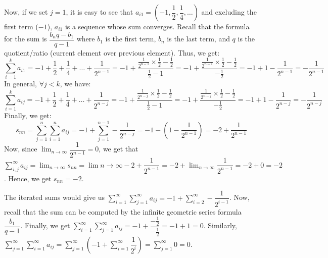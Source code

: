 \documentclass[11pt]{article}
\begin{document}
\begin{itemize}
        Now, if we set $j = 1$, it is easy to see that $a_{i1} = (-1,
        \dfrac{1}{2}, \dfrac{1}{4}, \dots)$ and excluding the first term
        ($-1$), $a_{i1}$ is a sequence whose sum converges. Recall that
        the formula for the sum is $\dfrac{b_nq - b_1}{q - 1}$ where $b_1$ is
        the first term, $b_n$ is the last term, and $q$ is the
        quotient/ratio (current element over previous element). Thus, we get:
        $$\sum_{i = 1}^k a_{i1} =  -1 + \dfrac{1}{2} + \dfrac{1}{4} + \dots +
        \dfrac{1}{2^{n - 1}} = -1 + \dfrac{\frac{1}{2^{n - 1}} \times
        \frac{1}{2} - \frac{1}{2}}{\frac{1}{2} - 1} = -1 + \dfrac{\frac{1}{2^{n
        - 1}} \times \frac{1}{2} - \frac{1}{2}}{-\frac{1}{2}} = -1 + 1 -
        \dfrac{1}{2^{n - 1}} = -\dfrac{1}{2^{n - 1}}$$
        In general, $\forall j < k$, we have:
        $$\sum_{i = 1}^k a_{ij} =  -1 + \dfrac{1}{2} + \dfrac{1}{4} + \dots +
        \dfrac{1}{2^{n - j}} = -1 + \dfrac{\frac{1}{2^{n - j}} \times
        \frac{1}{2} - \frac{1}{2}}{\frac{1}{2} - 1} = -1 + \dfrac{\frac{1}{2^{n
        - j}} \times \frac{1}{2} - \frac{1}{2}}{-\frac{1}{2}} = -1 + 1 -
        \dfrac{1}{2^{n - j}} = -\dfrac{1}{2^{n - j}}$$
        Finally, we get:
        $$s_{nn} = \sum_{j = 1}^{n}\sum_{i = 1}^{n} a_{ij} = -1 + \sum_{j =
        1}^{n - 1} -\dfrac{1}{2^{n - j}} = -1 - (1 - \dfrac{1}{2^{n - 1}}) = -2
        + \dfrac{1}{2^{n - 1}}$$
        Now, since $\lim_{n \to \infty} \dfrac{1}{2^{n - 1}} = 0$, we get that
        $\sum_{i, j}^\infty a_{ij} = \lim_{n \to \infty} s_{nn} = \lim{n \to
        \infty} -2 + \dfrac{1}{2^{n - 1}} = -2 + \lim_{n \to \infty}
        \dfrac{1}{2^{n - 1}} = -2 + 0 = -2$. Hence, we get $s_{nn} = -2$.

        The iterated sums would give us $\sum_{i = 1}^\infty\sum_{j = 1}^\infty
        a_{ij} = -1 + \sum_{i = 2}^\infty -\dfrac{1}{2^{i - 1}}$.  Now, recall
        that the sum can be computed by the infinite geometric series formula
        $\dfrac{b_1}{q - 1}$. Finally, we get $\sum_{i = 1}^\infty\sum_{j =
        1}^\infty a_{ij} = -1 + \dfrac{-\frac{1}{2}}{-\frac{1}{2}} = -1 + 1 =
        0$. Similarly, $\sum_{j = 1}^\infty\sum_{i = 1}^\infty a_{ij} = \sum_{j
        = 1}^\infty (-1 + \sum_{i = 1}^\infty\dfrac{1}{2^i}) = \sum_{j =
        1}^\infty 0 = 0$.
\end{itemize}

\end{document}
